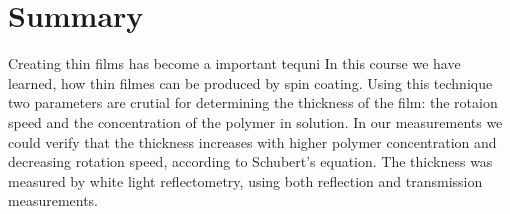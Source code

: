 

\chapter{Summary}
\label{chap:fazit}
Creating thin films has become a important tequni
In this course we have learned, how thin filmes can be produced by spin coating. Using this technique two parameters are crutial for determining the thickness of the film: the rotaion speed and the concentration of the polymer in solution. In our measurements we could verify that the thickness increases with higher polymer concentration and decreasing rotation speed, according to Schubert's equation. The thickness was measured by white light reflectometry, using both reflection and transmission measurements. 


